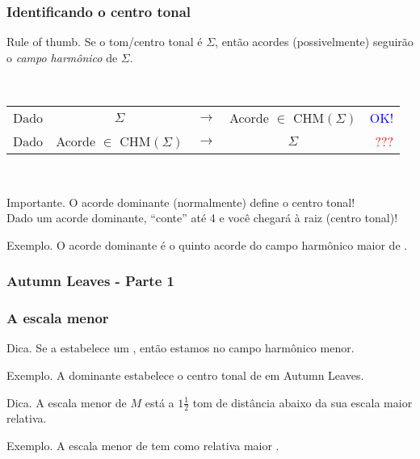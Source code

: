 \documentclass[usenames,dvipsnames]{beamer}
\newcommand\srbc[1]{{\footnotesize\rbc{#1}}}
\begin{document}
\begin{frame}
  \frametitle{Identificando o centro tonal}

  \begin{alertblock}{Rule of thumb.}
    Se o tom/centro tonal é $\Sigma$, então acordes (possivelmente) seguirão o \emph{campo
    harmônico} de $\Sigma$.
  \end{alertblock}~\\
  \pause

  \begin{table}
    \begin{tabular}{lcccr}
      Dado & $\Sigma$ & $\to$ & Acorde $\in$ CHM$(\Sigma)$ & \textcolor{blue}{OK!}\\
      Dado & Acorde $\in$ CHM$(\Sigma)$ & $\to$ & $\Sigma$ & \textcolor{red}{???}
    \end{tabular}
  \end{table}~\\
  \pause

  \begin{alertblock}{Importante.}
    O acorde dominante \srbc{V7} (normalmente) define o centro tonal!\\
    Dado um acorde dominante, ``conte'' até 4 e você chegará à raiz (centro tonal)!
  \end{alertblock}
  \pause

  \begin{exampleblock}{Exemplo.}
    O acorde dominante \srbc{D7} é o quinto acorde do campo harmônico maior de \srbc{G}.
  \end{exampleblock}
\end{frame}

\begin{frame}
  \frametitle{Autumn Leaves - Parte 1}

\end{frame}

\begin{frame}
  \frametitle{A escala menor}

  \begin{alertblock}{Dica.}
    Se a \srbc{V7} estabelece um \srbc{Im7}, então estamos no campo harmônico menor.
  \end{alertblock}
  \pause

  \begin{exampleblock}{Exemplo.}
    A dominante \srbc{B7} estabelece o centro tonal de \srbc{Em7} em Autumn Leaves.
  \end{exampleblock}
  \pause

  \begin{alertblock}{Dica.}
    A escala menor de $M$ está a $1\frac{1}{2}$ tom de distância abaixo da sua escala maior
    relativa.
  \end{alertblock}
  \pause

  \begin{exampleblock}{Exemplo.}
    A escala menor de \srbc{Em} tem como relativa maior \srbc{Gma}.
  \end{exampleblock}
\end{frame}
\end{document}
